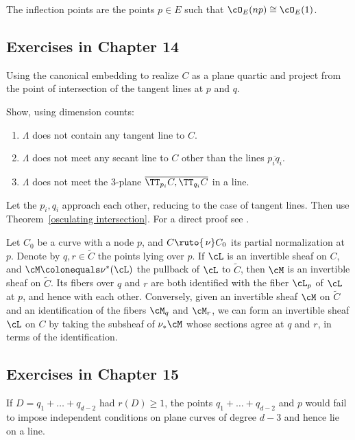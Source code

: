 The inflection points are the points $p \in E$ such
that $\cO_E(np) \cong \cO_E(1)$.

\subsection*{Exercises in Chapter 14}

 Using the canonical embedding to realize $C$ as a
plane quartic
%
and project from the point of intersection of the tangent lines at $p$ and $q$.

 Show, using dimension counts:
\begin{enumerate}
\item $\Lambda$ does not contain any tangent line to $C$.
\item $\Lambda$ does not meet any secant line to $C$ other than the
lines  $\overline{p_{i} q_{i}}$.
\item $\Lambda$ does not meet the 3-plane $\overline{\TT_{p_i}C,
\TT_{q_i}C}$ in a line.
\end{enumerate}

Let the $p_{i}, q_{i}$ approach each other, reducing to the case
of tangent lines. Then use
Theorem~\ref{osculating intersection}. 
For a direct proof see \cite[Lemma, p.~259]{Griffiths-Harris-BN}.

Let $C_{0}$ be a curve with a node $p$, and $C \ruto {\,\nu} C_{0}$
%
its
partial normalization
at $p$. Denote by $q,r \in \widetilde C$
the points lying over $p$. If $\cL$ is an invertible sheaf on $C$, and
$\cM \colonequals  \nu^*(\cL)$ the pullback of $\cL$ to $\widetilde C$,
then $\cM$ is an invertible sheaf on $\widetilde C$. Its fibers over $q$
and $r$ are both identified with the fiber $\cL_p$ of $\cL$ at $p$, and
hence with each other. Conversely, given an invertible sheaf $\cM$ on
$\widetilde C$ and an identification of the fibers $\cM_q$ and $\cM_r$,
we can form an invertible sheaf $\cL$ on $C$ by taking the subsheaf
of $\nu_*\cM$ whose sections agree at $q$ and $r$, in terms of the
identification.

\subsection*{Exercises in Chapter 15}

If $D = q_1 + \dots + q_{d-2}$ had $r(D) \geq 1$, the points 
$q_1 + \dots + q_{d-2}$ and $p$ would fail to impose
independent conditions on
%
plane curves of degree $d-3$ and hence lie on a line.

